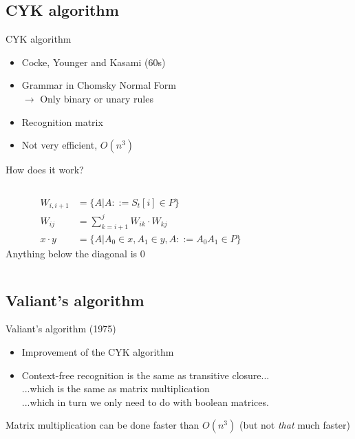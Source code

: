 \documentclass{beamer}
\newcommand{\subt}[3] { 
  \draw[grid] (#1,#1) -- (#1,#2) node[inChart] {#3} -- (#2,#2);
  \fill[color=black] (#1,#2) circle (2pt)
 }
\newcommand{\mrk}[2]{\node[inChart] at (#1,#1) {#2}}
\begin{document}
\subsection{CYK algorithm}
\begin{frame}{CYK algorithm}
    \begin{itemize}
        \item Cocke, Younger and Kasami (60s)
        \item Grammar in Chomsky Normal Form \\
              $\rightarrow$ Only binary or unary rules
        \item Recognition matrix
        \item Not very efficient, $O(n^3)$
    \end{itemize}
\end{frame}

\begin{frame}{How does it work?}
  \begin{columns}[c]
  \begin{column}{.5\textwidth}

    \begin{align*}
    W_{i,i+1} &= \{ A | A ::= S_t[i] \in P \} \\
    W_{ij}    &= \sum_{k=i+1}^{j} W_{ik} \cdot W_{kj} \\
    x \cdot y &= \{ A | A_0 \in x, A_1 \in y, A ::= A_0A_1 \in P \} \label{abc}
    \end{align*}
    Anything below the diagonal is 0

  \end{column}

  \begin{column}{.4\textwidth}
  \end{column}
  \end{columns}
\end{frame}

\subsection{Valiant's algorithm}
\begin{frame}{Valiant's algorithm (1975)}
    \begin{itemize}
        \item Improvement of the CYK algorithm
        \item Context-free recognition is the same as transitive closure...
            \\...which is the same as matrix multiplication
            \\...which in turn we only need to do with boolean matrices.
    \end{itemize}
    Matrix multiplication can be done faster than $O(n^3)$ (but not
    \textit{that} much faster)
\end{frame}
\end{document}
